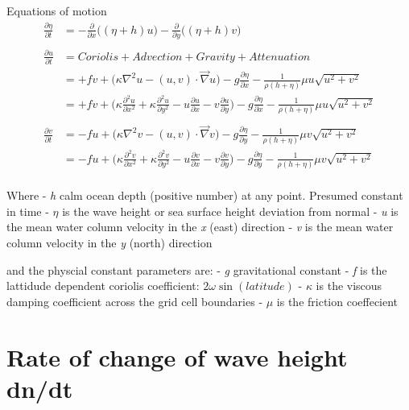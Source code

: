\documentclass[11pt]{article}
\begin{document}
Equations of motion \[
\begin{align}
\frac{\partial \eta}{\partial t} & =
    -\frac{\partial  }{\partial x} \bigl( \left( \eta + h\right)u \bigr) 
    - \frac{\partial  }{\partial y}  \bigl( \left( \eta + h\right)v \bigr)\\  
\\
\frac{\partial u}{\partial t} & = Coriolis + Advection + Gravity + Attenuation\\
 & = +fv +\bigl( \kappa\nabla^{2}u - (u,v)\cdot\vec\nabla u \bigr)  
    - g\frac{\partial \eta}{\partial x} - \frac{1}{\rho (h + \eta)} \mu u \sqrt{u^{2} + v^{2}}\\  
& = +fv +\bigl( \kappa\frac{\partial^{2} u}{\partial x^{2}}
           +\kappa\frac{\partial^{2} u}{\partial y^{2}}
           -u\frac{\partial u}{\partial x} - v\frac{\partial u}{\partial y}\bigr) 
           - g\frac{\partial \eta}{\partial x}
            - \frac{1}{\rho (h + \eta)} \mu u \sqrt{u^{2} + v^{2}}\\
\\
\frac{\partial v}{\partial t} & = -fu 
   + \bigl( \kappa\nabla^{2}v - (u,v)\cdot\vec\nabla v \bigr) 
    - g\frac{\partial \eta}{\partial y}
    - \frac{1}{\rho (h + \eta)} \mu v \sqrt{u^{2} + v^{2}}\\   
& = -fu+\bigl( \kappa\frac{\partial^{2} v}{\partial x^{2}}
           +\kappa\frac{\partial^{2} v}{\partial y^{2}}
           -u\frac{\partial v}{\partial x} - v\frac{\partial v}{\partial y}\bigr) 
           - g\frac{\partial \eta}{\partial y}
           - \frac{1}{\rho (h + \eta)} \mu v \sqrt{u^{2} + v^{2}}\\           
\end{align}
\]

Where - \emph{\emph{h}} calm ocean depth (positive number) at any point.
Presumed constant in time - \(\eta\) is the wave height or sea surface
height deviation from normal - \emph{\emph{u}} is the mean water column
velocity in the \emph{x} (east) direction - \emph{v} is the mean water
column velocity in the \emph{y} (north) direction

and the physcial constant parameters are: - \emph{g} gravitational
constant - \emph{f} is the lattidude dependent coriolis coefficient:
\(2\omega \sin(latitude)\) - \(\kappa\) is the viscous damping
coefficient across the grid cell boundaries - \(\mu\) is the friction
coeffecient

    \hypertarget{rate-of-change-of-wave-height-dndt}{%
\section{Rate of change of wave height
dn/dt}\label{rate-of-change-of-wave-height-dndt}}
\end{document}
